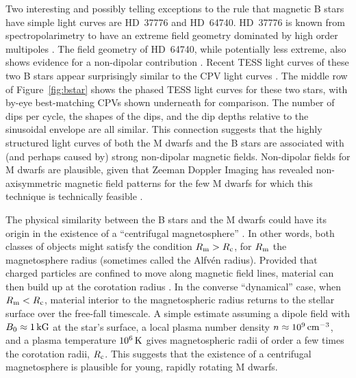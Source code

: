 \documentclass[11pt,twocolumn,tighten,linenumbers]{aastex63}
\begin{document}
Two interesting and possibly telling exceptions to the rule that
magnetic B stars have simple light curves are HD~37776 and HD~64740.
HD~37776 is known from spectropolarimetry to have an extreme field
geometry dominated by high order multipoles
\citep{2011ApJ...726...24K}.  The field geometry of HD~64740, while
potentially less extreme, also shows evidence for a non-dipolar
contribution \citep{2018MNRAS.475.5144S}.  Recent TESS light curves of
these two B stars appear surprisingly similar to the CPV light curves
\citep{2020pase.conf...46M}.  The middle row of Figure~\ref{fig:bstar}
shows the phased TESS light curves for these two stars, with by-eye
best-matching CPVs shown underneath for comparison.  The number of
dips per cycle, the shapes of the dips, and the dip depths relative to
the sinusoidal envelope are all similar.  This connection suggests
that the highly structured light curves of both the M dwarfs and the B
stars are associated with (and perhaps caused by) strong non-dipolar
magnetic fields.  Non-dipolar fields for M dwarfs are plausible, given
that Zeeman Doppler Imaging has revealed non-axisymmetric magnetic
field patterns for the few M dwarfs for which this technique is
technically feasible \citep[see][and references
therein]{2021A&ARv..29....1K}.


The physical similarity between the B stars and the M dwarfs could
have its origin in the existence of a ``centrifugal magnetosphere''
\citep[see][]{2013MNRAS.429..398P}.  In other words, both classes of
objects might satisfy the condition $R_{\rm m} > R_{\rm c}$, for
$R_{\rm m}$ the magnetosphere radius (sometimes called the Alfv\'en
radius).  Provided that charged particles are confined to move along
magnetic field lines, material can then build up at the corotation
radius \citep[e.g.][Sec.\ 4, and references
therein]{2015SSRv..191..339R}.  In the converse ``dynamical'' case,
when $R_{\rm m} < R_{\rm c}$, material interior to the magnetospheric
radius returns to the stellar surface over the free-fall timescale.  A
simple estimate assuming a dipole field with $B_0\approx1\,{\rm kG}$
at the star's surface, a local plasma number density
$n\approx10^9\,{\rm cm^{-3}}$, and a plasma temperature $10^6\,{\rm
K}$ gives magnetospheric radii of order a few times the corotation
radii, $R_{\rm c}$.  This suggests that the existence of a centrifugal
magnetosphere is plausible for young, rapidly rotating M dwarfs.


%
\end{document}
